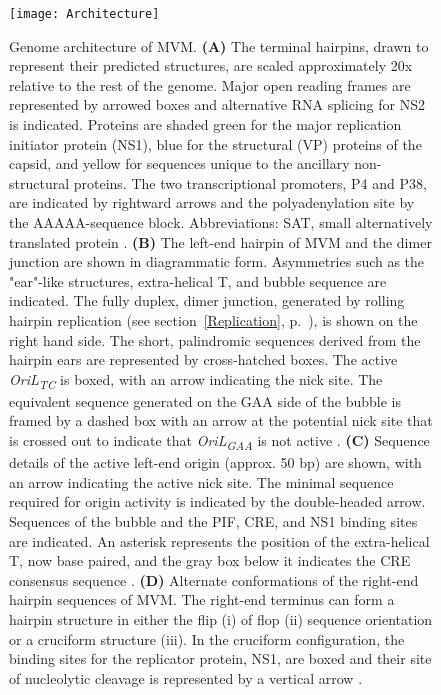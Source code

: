 \begin{figure}
\centering
  \texttt{[image: Architecture]}
  \vspace{-8em}
  \caption[Genome architecture of minute virus of mice (MVM).]
   {Genome architecture of MVM. \textbf{(A)} The terminal hairpins, drawn to represent their predicted structures, are scaled approximately 20x relative to the rest of the genome. Major open reading frames are represented by arrowed boxes and alternative RNA splicing for NS2 is indicated. Proteins are shaded green for the major replication initiator protein (NS1), blue for the structural (VP) proteins of the capsid, and yellow for sequences unique to the ancillary non-structural proteins. The two transcriptional promoters, P4 and P38, are indicated by rightward arrows and the polyadenylation site by the AAAAA-sequence block. Abbreviations: SAT, small alternatively translated protein \cite{small}. \textbf{(B)} The left-end hairpin of MVM and the dimer junction are shown in diagrammatic form. Asymmetries such as the "ear"-like structures, extra-helical T, and bubble sequence are indicated. The fully duplex, dimer junction, generated by rolling hairpin replication (see section~\ref{Replication}, p.~\pageref{Replication}), is shown on the right hand side. The short, palindromic sequences derived from the hairpin ears are represented by cross-hatched boxes. The active \textit{OriL\textsubscript{TC}} is boxed, with an arrow indicating the nick site. The equivalent sequence generated on the GAA side of the bubble is framed by a dashed box with an arrow at the potential nick site that is crossed out to indicate that \textit{OriL\textsubscript{GAA}} is not active \cite{pmid12885883, pmid16928767}. \textbf{(C)} Sequence details of the active left-end origin (approx. 50 bp) are shown, with an arrow indicating the active nick site. The minimal sequence required for origin activity is indicated by the double-headed arrow. Sequences of the bubble and the PIF, CRE, and NS1 binding sites are indicated. An asterisk represents the position of the extra-helical T, now base paired, and the gray box below it indicates the CRE consensus sequence \cite{pmid12885883}. \textbf{(D)} Alternate conformations of the right-end hairpin sequences of MVM. The right-end terminus can form a hairpin structure in either the flip (i) of flop (ii) sequence orientation or a cruciform structure (iii). In the cruciform configuration, the binding sites for the replicator protein, NS1, are boxed and their site of nucleolytic cleavage is represented by a vertical arrow \cite{pmid8614999}.
} 
\label{Architecture}
\end{figure}


